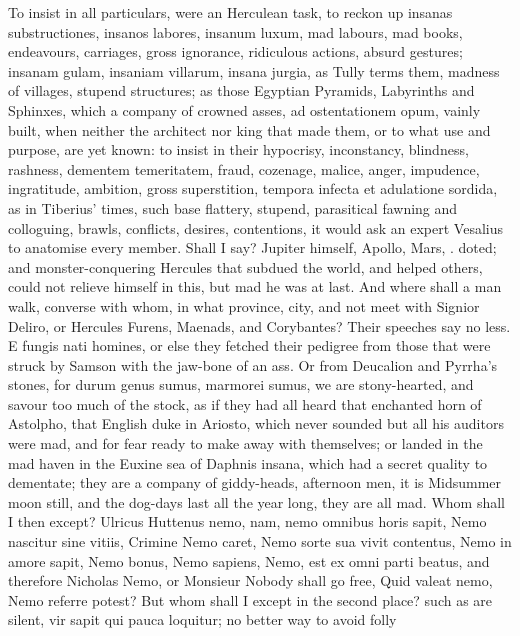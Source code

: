 {To insist in all particulars, were an Herculean task, to
reckon up insanas substructiones, insanos labores, insanum
luxum, mad labours, mad books, endeavours, carriages, gross ignorance,
ridiculous actions, absurd gestures; insanam gulam, insaniam villarum,
insana jurgia, as Tully terms them, madness of villages, stupend
structures; as those Egyptian Pyramids, Labyrinths and Sphinxes, which
a company of crowned asses, ad ostentationem opum, vainly built, when
neither the architect nor king that made them, or to what use and
purpose, are yet known: to insist in their hypocrisy, inconstancy,
blindness, rashness, dementem temeritatem, fraud, cozenage, malice,
anger, impudence, ingratitude, ambition, gross superstition,
tempora infecta et adulatione sordida, as in Tiberius' times, such
base flattery, stupend, parasitical fawning and colloguing, \etc{} brawls,
conflicts, desires, contentions, it would ask an expert Vesalius to
anatomise every member. Shall I say? Jupiter himself, Apollo, Mars, \etc.
doted; and monster-conquering Hercules that subdued the world, and
helped others, could not relieve himself in this, but mad he was at
last. And where shall a man walk, converse with whom, in what province,
city, and not meet with Signior Deliro, or Hercules Furens, Maenads,
and Corybantes? Their speeches say no less. E fungis nati homines,
or else they fetched their pedigree from those that were struck by
Samson with the jaw-bone of an ass. Or from Deucalion and Pyrrha's
stones, for durum genus sumus,  marmorei sumus, we are
stony-hearted, and savour too much of the stock, as if they had all
heard that enchanted horn of Astolpho, that English duke in Ariosto,
which never sounded but all his auditors were mad, and for fear ready
to make away with themselves; or landed in the mad haven in the
Euxine sea of Daphnis insana, which had a secret quality to dementate;
they are a company of giddy-heads, afternoon men, it is Midsummer moon
still, and the dog-days last all the year long, they are all mad. Whom
shall I then except? Ulricus Huttenus nemo, nam, nemo omnibus
horis sapit, Nemo nascitur sine vitiis, Crimine Nemo caret, Nemo sorte
sua vivit contentus, Nemo in amore sapit, Nemo bonus, Nemo sapiens,
Nemo, est ex omni parti beatus, \etc{} and therefore Nicholas Nemo,
or Monsieur Nobody shall go free, Quid valeat nemo, Nemo referre
potest? But whom shall I except in the second place? such as are
silent, vir sapit qui pauca loquitur; no better way to avoid folly
}
